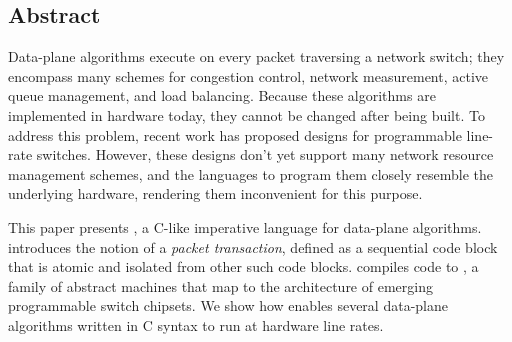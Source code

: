 \subsection*{Abstract}
Data-plane algorithms execute on every packet traversing a network
switch; they encompass many schemes for congestion control, network
measurement, active queue management, and load balancing. Because
these algorithms are implemented in hardware today, they cannot be
changed after being built. To address this problem, recent work has
proposed designs for programmable line-rate switches. However, these
designs don't yet support many network resource management schemes,
and the languages to program them closely resemble the underlying
hardware, rendering them inconvenient for this purpose.

This paper presents \pktlanguage, a C-like imperative language for data-plane
algorithms. \pktlanguage introduces the notion of a {\em packet
transaction}, defined as a sequential code block that is atomic and
isolated from other such code blocks.
compiles \pktlanguage code to \absmachine, a family of abstract
machines that map to the architecture of emerging programmable switch
chipsets. We show how \pktlanguage enables several data-plane
algorithms written in C syntax to run at hardware line rates.

